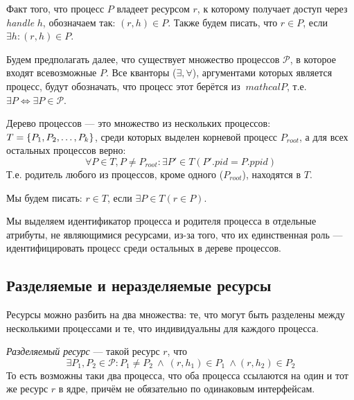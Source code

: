 Факт того, что процесс $P$ владеет ресурсом $r$, к которому получает доступ через \textit{handle} $h$, обозначаем так: 
$(r, h) \in P$. Также будем писать, что $r \in P$, если $\exists h: (r, h) \in P$.

Будем предполагать далее, что существует множество процессов $\mathcal{P}$, в которое входят всевозможные $P$. Все 
кванторы ($\exists, \forall$), аргументами которых является процесс, будут обозначать, что процесс этот берётся из $\
mathcal{P}$, т.е. $\exists P \Longleftrightarrow \exists P \in \mathcal{P}$.

\begin{defn}
Дерево процессов --- это множество из нескольких процессов: $T = \left\lbrace P_1, P_2, \ldots, P_k \right\rbrace$, среди которых 
выделен корневой процесс $P_{root}$, а для всех остальных процессов верно:
\begin{equation*}
\forall P \in T, P \neq P_{root}: \exists P' \in T (P'.pid = P.ppid)
\end{equation*}
Т.е. родитель любого из процессов, кроме одного ($P_{root}$), находятся в $T$.
\end{defn}

Мы будем писать: $r \in T$, если $\exists P \in T (r \in P)$.

Мы выделяем идентификатор процесса и родителя процесса в отдельные атрибуты, не являющимися ресурсами, из-за того, 
что их единственная роль --- идентифицировать процесс среди остальных в дереве процессов.

\subsection{Разделяемые и неразделяемые ресурсы}

Ресурсы можно разбить на два множества: те, что могут быть разделены между несколькими процессами и те, что 
индивидуальны для каждого процесса.

\begin{defn}
\emph{Разделяемый ресурс} --- такой ресурс $r$, что
\begin{equation*}
\exists P_1, P_2 \in \mathcal{P}: P_1 \neq P_2\ \land\ (r, h_1) \in P_1\ \land (r, h_2) \in P_2
\end{equation*}
 То есть возможны таки два процесса, что оба процесса ссылаются на один и тот же ресурс $r$ в ядре, причём не 
 обязательно по одинаковым интерфейсам.
\end{defn}

